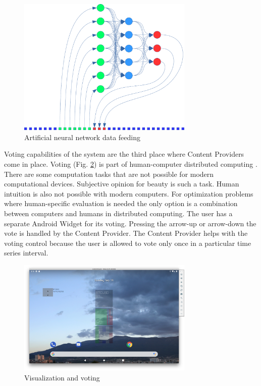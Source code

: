 \documentclass{ifacconf}
\begin{document}
\begin{figure}
\begin{center}
\includegraphics[width=8.4cm]{images/fig0005}
\caption{Artificial neural network data feeding} 
\label{fig0005}
\end{center}
\end{figure}

Voting capabilities of the system are the third place where Content Providers come in place. Voting (Fig. \ref{fig0007}) is part of human-computer distributed computing \cite{Tomov-2019-a}. There are some computation tasks that are not possible for modern computational devices. Subjective opinion for beauty is such a task. Human intuition is also not possible with modern computers. For optimization problems where human-specific evaluation is needed the only option is a combination between computers and humans in distributed computing. The user has a separate Android Widget for its voting. Pressing the arrow-up or arrow-down the vote is handled by the Content Provider. The Content Provider helps with the voting control because the user is allowed to vote only once in a particular time series interval. 

\begin{figure}
\begin{center}
\includegraphics[width=8.4cm]{images/fig0007}
\caption{Visualization and voting} 
\label{fig0007}
\end{center}
\end{figure}
\end{document}
